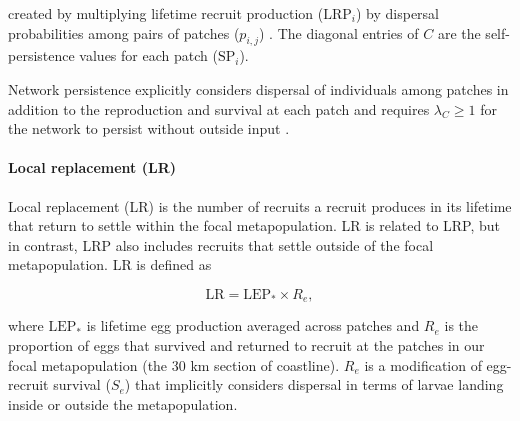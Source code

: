 \documentclass[12pt, oneside]{article}   	%
\begin{document}
created by multiplying lifetime recruit production ($\text{LRP}_i$) by dispersal probabilities among pairs of patches ($p_{i,j}$) \citep{burgess2014beyond}. The diagonal entries of $C$ are the self-persistence values for each patch ($\text{SP}_i$).

Network persistence explicitly considers dispersal of individuals among patches in addition to the reproduction and survival at each patch and requires $\lambda_C \geq 1$ for the network to persist without outside input \citep{hastings_persistence_2006, white_population_2010, burgess2014beyond}.

\paragraph*{Local replacement (LR)}

Local replacement (LR) is the number of recruits a recruit produces in its lifetime that return to settle within the focal metapopulation. LR is related to LRP, but in contrast, LRP also includes recruits that settle outside of the focal metapopulation. LR is defined as 

\begin{equation}
\text{LR} = \text{LEP}_* \times R_e, \label{EQN_LR}
\end{equation}

where $\text{LEP}_*$ is lifetime egg production averaged across patches and $R_e$ is the proportion of eggs that survived and returned to recruit at the patches in our focal metapopulation (the 30 km section of coastline). $R_e$ is a modification of egg-recruit survival ($S_e$) that implicitly considers dispersal in terms of larvae landing inside or outside the metapopulation. 
\end{document}
